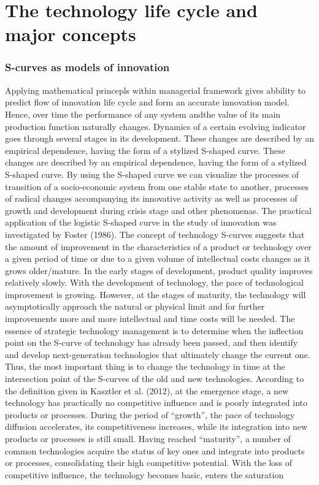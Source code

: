 \documentclass[12pt,twoside]{reedthesis}
\begin{document}
\hypertarget{the-technology-life-cycle-and-major-concepts}{%
\chapter{The technology life cycle and major concepts}\label{the-technology-life-cycle-and-major-concepts}}

\hypertarget{s-curves-as-models-of-innovation}{%
\subsection{S-curves as models of innovation}\label{s-curves-as-models-of-innovation}}

Applying mathematical princepls within managerial framework gives abbility to predict flow of innovation life cycle and form an accurate innovation model. Hence, over time the performance of any system andthe value of its main production function naturally changes. Dynamics of a certain evolving indicator goes through several stages in its development. These changes are described by an empirical dependence, having the form of a stylized S-shaped curve. These changes are described by an empirical dependence, having the form of a stylized S-shaped curve. By using the S-shaped curve we can visualize the processes of transition of a socio-economic system from one stable state to another, processes of radical changes accompanying its innovative activity as well as processes of growth and development during crisis stage and other phenomenas. The practical application of the logistic S-shaped curve in the study of innovation was investigated by Foster (1986). The concept of technology S-curves suggests that the amount of improvement in the characteristics of a product or technology over a given period of time or due to a given volume of intellectual costs changes as it grows older/mature. In the early stages of development, product quality improves relatively slowly. With the development of technology, the pace of technological improvement is growing. However, at the stages of maturity, the technology will asymptotically approach the natural or physical limit and for further improvements more and more intellectual and time costs will be needed. The essence of strategic technology management is to determine when the inflection point on the S-curve of technology has already been passed, and then identify and develop next-generation technologies that ultimately change the current one. Thus, the most important thing is to change the technology in time at the intersection point of the S-curves of the old and new technologies. According to the definition given in Kasztler et al. (2012), at the emergence stage, a new technology has practically no competitive influence and is poorly integrated into products or processes. During the period of ``growth'', the pace of technology diffusion accelerates, its competitiveness increases, while its integration into new products or processes is still small. Having reached ``maturity'', a number of common technologies acquire the status of key ones and integrate into products or processes, consolidating their high competitive potential. With the loss of competitive influence, the technology becomes basic, enters the saturation 
\end{document}
